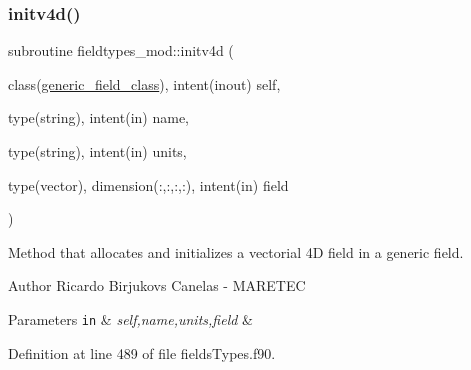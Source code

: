 \subsubsection{\texorpdfstring{initv4d()}{initv4d()}}
{\footnotesize\ttfamily subroutine fieldtypes\+\_\+mod\+::initv4d (\begin{DoxyParamCaption}\item[{class(\mbox{\hyperlink{structfieldtypes__mod_1_1generic__field__class}{generic\+\_\+field\+\_\+class}}), intent(inout)}]{self,  }\item[{type(string), intent(in)}]{name,  }\item[{type(string), intent(in)}]{units,  }\item[{type(vector), dimension(\+:,\+:,\+:,\+:), intent(in)}]{field }\end{DoxyParamCaption})\hspace{0.3cm}{\ttfamily [private]}}



Method that allocates and initializes a vectorial 4D field in a generic field. 

\begin{DoxyAuthor}{Author}
Ricardo Birjukovs Canelas -\/ M\+A\+R\+E\+T\+EC 
\end{DoxyAuthor}

\begin{DoxyParams}[1]{Parameters}
\mbox{\tt in}  & {\em self,name,units,field} & \\
\hline
\end{DoxyParams}


Definition at line 489 of file fields\+Types.\+f90.


